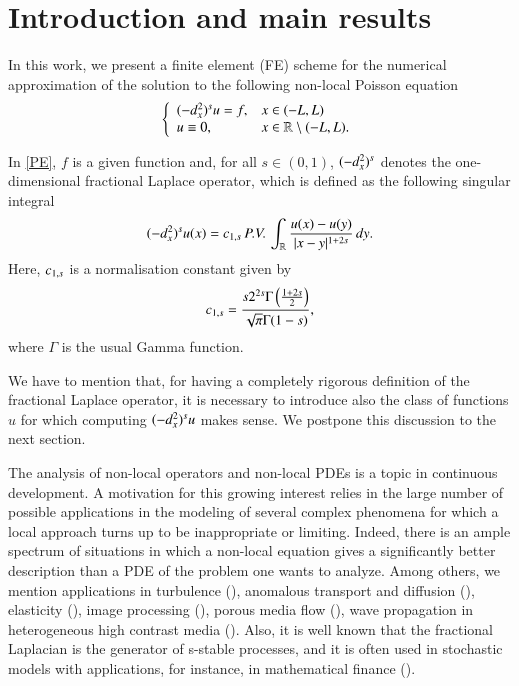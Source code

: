 \section{Introduction and main results}\label{intro_sec}

In this work, we present a finite element (FE) scheme for the numerical approximation of the solution to the following non-local Poisson equation
\begin{align}\label{PE}
	\left\{\begin{array}{ll}
		(-d_x^2)^{s}u = f, & x\in(-L,L)
		\\
		u\equiv 0, & x\in\mathbb{R}\setminus(-L,L).
	\end{array}\right.
\end{align}

In \eqref{PE}, $f$ is a given function and, for all $s\in(0,1)$, $(-d_x^2)^{s}$ denotes the one-dimensional fractional Laplace operator, which is defined as the following singular integral
\begin{align*}
	(-d_x^2)^{s}u(x) = c_{1,s}\,P.V.\,\int_{\mathbb{R}}\frac{u(x)-u(y)}{|x-y|^{1+2s}}\,dy. 
\end{align*}
Here, $c_{1,s}$ is a normalisation constant given by
\begin{align*}
	c_{1,s} = \frac{s2^{2s}\Gamma\left(\frac{1+2s}{2}\right)}{\sqrt{\pi}\Gamma(1-s)},
\end{align*}
where $\Gamma$ is the usual Gamma function. 

We have to mention that, for having a completely rigorous definition of the fractional Laplace operator, it is necessary to introduce also the class of functions $u$ for which computing $(-d_x^2)^{s}u$ makes sense. We postpone this discussion to the next section.

The analysis of non-local operators and non-local PDEs is a topic in continuous development.
A motivation for this growing interest relies in the large number of possible applications in the modeling of several complex phenomena for which a local approach turns up to be inappropriate or limiting.
Indeed, there is an ample spectrum of situations in which a non-local equation gives a
significantly better description than a PDE of the problem one wants to analyze.
Among others, we mention applications in turbulence (\cite{bakunin2008turbulence}), anomalous transport and diffusion (\cite{bologna2000anomalous,meerschaert2012fractional}), elasticity (\cite{dipierro2015dislocation}), image processing (\cite{gilboa2008nonlocal}), porous media flow (\cite{vazquez2012nonlinear}), wave propagation in heterogeneous high contrast media (\cite{zhu2014modeling}). Also, it is well known that the fractional Laplacian is the generator of s-stable processes, and it is often used in stochastic models with applications, for instance, in mathematical finance (\cite{levendorskii2004pricing,pham1997optimal}).

